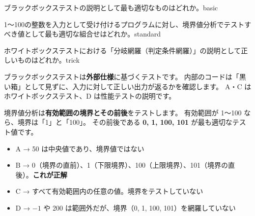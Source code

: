 
\begin{mondai}{ブラックボックステストの説明として最も適切なものはどれか。}{basic}
\end{mondai}

\begin{mondai}{1〜100の整数を入力として受け付けるプログラムに対し、境界値分析でテストすべき値として最も適切な組合せはどれか。}{standard}
\end{mondai}

\begin{mondai}{ホワイトボックステストにおける「分岐網羅（判定条件網羅）」の説明として正しいものはどれか。}{trick}
\end{mondai}

\kaitoupage

\begin{kaisetsu}
ブラックボックステストは\textbf{外部仕様}に基づくテストです。
内部のコードは「黒い箱」として見ずに、入力に対して正しい出力が返るかを確認します。
A・C はホワイトボックステスト、D は性能テストの説明です。
\end{kaisetsu}

\begin{kaisetsu}
境界値分析は\textbf{有効範囲の境界とその前後}をテストします。
有効範囲が 1〜100 なら、境界は「1」と「100」。
その前後である \textbf{0, 1, 100, 101} が最も適切なテスト値です。
\end{kaisetsu}
\begin{goutoubun}
\begin{itemize}
  \item A → 50 は中央値であり、境界値ではない
  \item B → 0（境界の直前）、1（下限境界）、100（上限境界）、101（境界の直後）。\textbf{これが正解}
  \item C → すべて有効範囲内の任意の値。境界をテストしていない
  \item D → $-1$ や 200 は範囲外だが、境界（0, 1, 100, 101）を網羅していない
\end{itemize}
\end{goutoubun}

